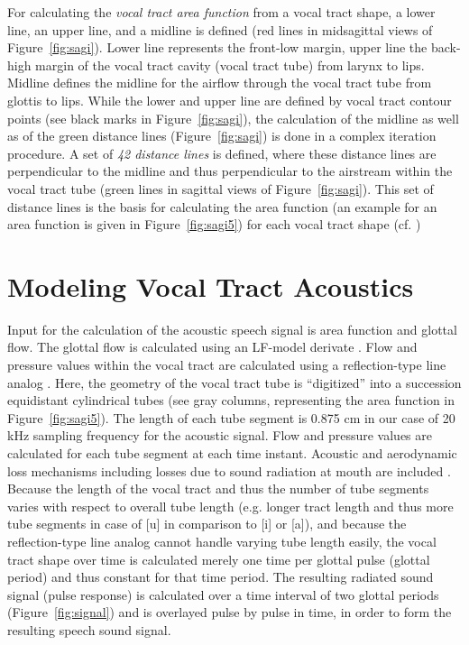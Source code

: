 \documentclass[conference]{IEEEtran}
\begin{document}
For calculating the \textit{vocal tract area function} from a vocal
tract shape, a lower line, an upper line, and a midline is defined
(red lines in midsagittal views of Figure~\ref{fig:sagi}). Lower line
represents the front-low margin, upper line the back-high margin of
the vocal tract cavity (vocal tract tube) from larynx to lips. Midline
defines the midline for the airflow through the vocal tract tube from
glottis to lips. While the lower and upper line are defined by vocal
tract contour points (see black marks in Figure~\ref{fig:sagi}), the
calculation of the midline as well as of the green distance lines
(Figure~\ref{fig:sagi}) is done in a complex iteration procedure. A
set of \textit{42 distance lines} is defined, where these distance
lines are perpendicular to the midline and thus perpendicular to the
airstream within the vocal tract tube (green lines in sagittal views
of Figure~\ref{fig:sagi}). This set of distance lines is the basis for
calculating the area function (an example for an area function is
given in Figure~\ref{fig:sagi5}) for each vocal tract shape (cf.
\cite{perrier1992})

\section{Modeling Vocal Tract Acoustics}

Input for the calculation of the acoustic speech signal is area
function and glottal flow. The glottal flow is calculated using an
LF-model derivate \cite{veldhuis1998}. Flow and pressure values within
the vocal tract are calculated using a reflection-type line analog
\cite{liljencrants1985}. Here, the geometry of the vocal tract tube is
``digitized'' into a succession equidistant cylindrical tubes (see
gray columns, representing the area function in
Figure~\ref{fig:sagi5}). The length of each tube segment is 0.875 cm
in our case of 20 kHz sampling frequency for the acoustic signal. Flow
and pressure values are calculated for each tube segment at each time
instant. Acoustic and aerodynamic loss mechanisms including losses due
to sound radiation at mouth are included \cite{liljencrants1985}.
Because the length of the vocal tract and thus the number of tube
segments varies with respect to overall tube length (e.g. longer tract
length and thus more tube segments in case of [u] in comparison to [i]
or [a]), and because the reflection-type line analog cannot handle
varying tube length easily, the vocal tract shape over time is
calculated merely one time per glottal pulse (glottal period) and thus
constant for that time period. The
resulting radiated sound signal (pulse response) is calculated over a
time interval of two glottal periods (Figure~\ref{fig:signal}) and is
overlayed pulse by pulse in time, in order to form the resulting speech
sound signal.
\end{document}
